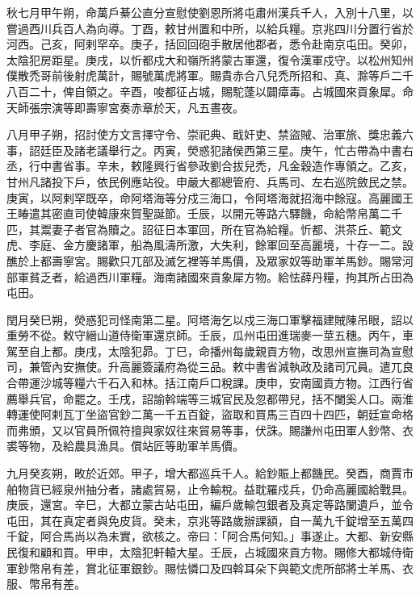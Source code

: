 \begin{pinyinscope}
 秋七月甲午朔，命萬戶綦公直分宣慰使劉恩所將屯肅州漢兵千人，入別十八里，以嘗過西川兵百人為向導。丁酉，敕甘州置和中所，以給兵糧。京兆四川分置行省於河西。己亥，阿剌罕卒。庚子，括回回砲手散居他郡者，悉令赴南京屯田。癸卯，太陰犯房距星。庚戌，以忻都戍大和嶺所將蒙古軍還，復令漢軍戍守。以松州知州僕散禿哥前後射虎萬計，賜號萬虎將軍。賜貴赤合八兒禿所招和、真、滁等戶二千八百二十，俾自領之。辛酉，唆都征占城，賜駝蓬以闢瘴毒。占城國來貢象犀。命天師張宗演等即壽寧宮奏赤章於天，凡五晝夜。



 八月甲子朔，招討使方文言擇守令、崇祀典、戢奸吏、禁盜賊、治軍旅、獎忠義六事，詔廷臣及諸老議舉行之。丙寅，熒惑犯諸侯西第三星。庚午，忙古帶為中書右丞，行中書省事。辛未，敕隆興行省參政劉合拔兒禿，凡金穀造作專領之。乙亥，甘州凡諸投下戶，依民例應站役。申嚴大都總管府、兵馬司、左右巡院斂民之禁。庚寅，以阿剌罕既卒，命阿塔海等分戍三海口，令阿塔海就招海中餘寇。高麗國王王睶遣其密直司使韓康來賀聖誕節。壬辰，以開元等路六驛饑，命給幣帛萬二千匹，其鬻妻子者官為贖之。詔征日本軍回，所在官為給糧。忻都、洪茶丘、範文虎、李庭、金方慶諸軍，船為風濤所激，大失利，餘軍回至高麗境，十存一二。設醮於上都壽寧宮。賜歡只兀部及滅乞裡等羊馬價，及眾家奴等助軍羊馬鈔。賜常河部軍貧乏者，給過西川軍糧。海南諸國來貢象犀方物。給怯薛丹糧，拘其所占田為屯田。



 閏月癸巳朔，熒惑犯司怪南第二星。阿塔海乞以戍三海口軍擊福建賊陳吊眼，詔以重勞不從。敕守縉山道侍衛軍還京師。壬辰，瓜州屯田進瑞麥一莖五穗。丙午，車駕至自上都。庚戌，太陰犯昴。丁巳，命播州每歲親貢方物，改思州宣撫司為宣慰司，兼管內安撫使。升高麗簽議府為從三品。敕中書省減執政及諸司冗員。遣兀良合帶運沙城等糧六千石入和林。括江南戶口稅課。庚申，安南國貢方物。江西行省薦舉兵官，命罷之。壬戌，詔諭斡端等三城官民及忽都帶兒，括不闌奚人口。兩淮轉運使阿剌瓦丁坐盜官鈔二萬一千五百錠，盜取和買馬三百四十四匹，朝廷宣命格而弗頒，又以官員所佩符擅與家奴往來貿易等事，伏誅。賜謙州屯田軍人鈔幣、衣裘等物，及給農具漁具。償站匠等助軍羊馬價。



 九月癸亥朔，畋於近郊。甲子，增大都巡兵千人。給鈔賑上都饑民。癸酉，商賈市舶物貨已經泉州抽分者，諸處貿易，止令輸稅。益耽羅戍兵，仍命高麗國給戰具。庚辰，還宮。辛巳，大都立蒙古站屯田，編戶歲輸包銀者及真定等路闌遺戶，並令屯田，其在真定者與免皮貨。癸未，京兆等路歲辦課額，自一萬九千錠增至五萬四千錠，阿合馬尚以為未實，欲核之。帝曰：「阿合馬何知。」事遂止。大都、新安縣民復和顧和買。甲申，太陰犯軒轅大星。壬辰，占城國來貢方物。賜修大都城侍衛軍鈔幣帛有差，賞北征軍銀鈔。賜怯憐口及四斡耳朵下與範文虎所部將士羊馬、衣服、幣帛有差。




\end{pinyinscope}
